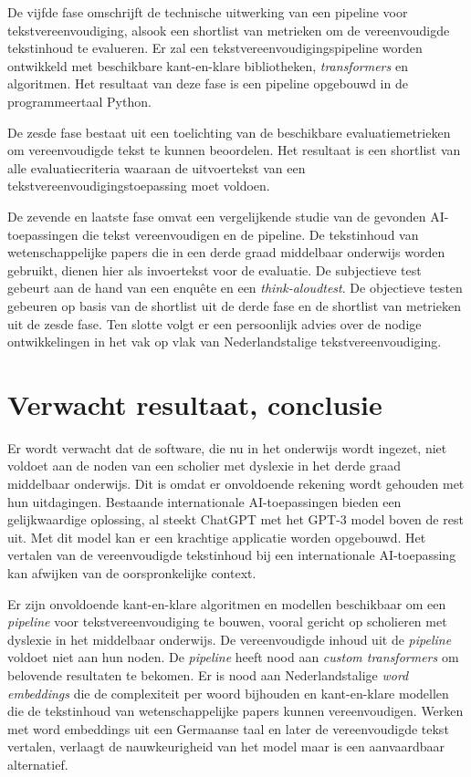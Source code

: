 De vijfde fase omschrijft de technische uitwerking van een pipeline voor tekstvereenvoudiging, alsook een shortlist van metrieken om de vereenvoudigde tekstinhoud te evalueren. Er zal een tekstvereenvoudigingspipeline worden ontwikkeld met beschikbare kant-en-klare bibliotheken, \textit{transformers} en algoritmen. Het resultaat van deze fase is een pipeline opgebouwd in de programmeertaal Python. 

De zesde fase bestaat uit een toelichting van de beschikbare evaluatiemetrieken om vereenvoudigde tekst te kunnen beoordelen. Het resultaat is een shortlist van alle evaluatiecriteria waaraan de uitvoertekst van een tekstvereenvoudigingstoepassing moet voldoen.

De zevende en laatste fase omvat een vergelijkende studie van de gevonden AI-toepassingen die tekst vereenvoudigen en de pipeline. De tekstinhoud van wetenschappelijke papers die in een derde graad middelbaar onderwijs worden gebruikt, dienen hier als invoertekst voor de evaluatie. De subjectieve test gebeurt aan de hand van een enquête en een \textit{think-aloudtest}. De objectieve testen gebeuren op basis van de shortlist uit de derde fase en de shortlist van metrieken uit de zesde fase. Ten slotte volgt er een persoonlijk advies over de nodige ontwikkelingen in het vak op vlak van Nederlandstalige tekstvereenvoudiging.

\section{Verwacht resultaat, conclusie}
\label{sec:verwachte_resultaten}

Er wordt verwacht dat de software, die nu in het onderwijs wordt ingezet, niet voldoet aan de noden van een scholier met dyslexie in het derde graad middelbaar onderwijs. Dit is omdat er onvoldoende rekening wordt gehouden met hun uitdagingen. Bestaande internationale AI-toepassingen bieden een gelijkwaardige oplossing, al steekt ChatGPT met het GPT-3 model boven de rest uit. Met dit model kan er een krachtige applicatie worden opgebouwd. Het vertalen van de vereenvoudigde tekstinhoud bij een internationale AI-toepassing kan afwijken van de oorspronkelijke context.

Er zijn onvoldoende kant-en-klare algoritmen en modellen beschikbaar om een \textit{pipeline} voor tekstvereenvoudiging te bouwen, vooral gericht op scholieren met dyslexie in het middelbaar onderwijs. De vereenvoudigde inhoud uit de \textit{pipeline} voldoet niet aan hun noden. De \textit{pipeline} heeft nood aan \textit{custom transformers} om belovende resultaten te bekomen. Er is nood aan Nederlandstalige \textit{word embeddings} die de complexiteit per woord bijhouden en kant-en-klare modellen die de tekstinhoud van wetenschappelijke papers kunnen vereenvoudigen. Werken met word embeddings uit een Germaanse taal en later de vereenvoudigde tekst vertalen, verlaagt de nauwkeurigheid van het model maar is een aanvaardbaar alternatief.